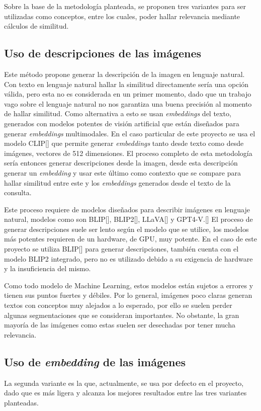Sobre la base de la metodolog\'ia planteada, se proponen tres variantes para ser utilizadas como conceptos, entre los cuales, poder hallar relevancia mediante cálculos de similitud.

\subsection{Uso de descripciones de las imágenes}
Este método propone generar la descripción de la imagen en lenguaje natural. Con texto en lenguaje natural hallar la similitud directamente sería una opción válida, pero esta no es considerada en un primer momento, dado que un trabajo vago sobre el lenguaje natural no nos garantiza una buena precisión al momento de hallar similitud. Como alternativa a esto se usan \textit{embeddings} del texto, generados con modelos potentes de visión artificial que están diseñados para generar \textit{embeddings} multimodales. En el caso particular de este proyecto se usa el modelo CLIP[\cite{clip}] que permite generar \textit{embeddings} tanto desde texto como desde imágenes, vectores de 512 dimensiones. El proceso completo de esta metodología sería entonces generar descripciones desde la imagen, desde esta descripción generar un \textit{embedding} y usar este último como contexto que se compare para hallar similitud entre este y los \textit{embeddings} generados desde el texto de la consulta.

Este proceso requiere de modelos diseñados para describir imágenes en lenguaje natural, modelos como son BLIP[\cite{blip}], BLIP2[\cite{blip-2}], LLaVA[\cite{llava}] y GPT4-V.[\cite{gpt-4v}] El proceso de generar descripciones suele ser lento según el modelo que se utilice, los modelos más potentes requieren de un hardware, de GPU, muy potente. En el caso de este proyecto se utiliza BLIP[\cite{blip}] para generar descripciones, también cuenta con el modelo BLIP2 integrado, pero no es utilizado debido a su exigencia de hardware y la insuficiencia del mismo.

Como todo modelo de Machine Learning, estos modelos están sujetos a errores y tienen sus puntos fuertes y débiles. Por lo general, imágenes poco claras generan textos con conceptos muy alejados a lo esperado, por ello se suelen perder algunas segmentaciones que se consideran importantes. No obstante, la gran mayoría de las imágenes como estas suelen ser desechadas por tener mucha relevancia.

\subsection{Uso de \textit{embedding} de las imágenes}
La segunda variante es la que, actualmente, se usa por defecto en el proyecto, dado que es más ligera y alcanza los mejores resultados entre las tres variantes planteadas.


